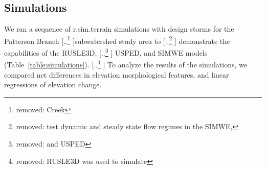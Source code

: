 \documentclass[gmd, manuscript]{copernicus}
\providecommand{\DIFadd}[1]{{\protect\color{blue} \sf #1}} %
\providecommand{\DIFdel}[1]{{\protect\color{red} [..\footnote{removed: #1} ]}} %
\providecommand{\DIFaddbegin}{} %
\providecommand{\DIFaddend}{} %
\providecommand{\DIFdelbegin}{} %
\providecommand{\DIFdelend}{} %
\begin{document}
\subsection{Simulations}
%
We ran a sequence of r.sim.terrain simulations 
\DIFaddbegin \DIFadd{with design storms
}\DIFaddend for the Patterson Branch \DIFdelbegin \DIFdel{Creek }\DIFdelend subwatershed study area
to \DIFdelbegin \DIFdel{test dynamic and steady state flow regimes
in the SIMWE, }\DIFdelend \DIFaddbegin \DIFadd{demonstrate the capabilities 
of the }\DIFaddend RUSLE3D, \DIFdelbegin \DIFdel{and USPED}\DIFdelend \DIFaddbegin \DIFadd{USPED, and SIMWE }\DIFaddend models
(Table~\ref{table:simulations}).
%
\DIFdelbegin \DIFdel{RUSLE3D was used to simulate }\DIFdelend \DIFaddbegin \DIFadd{To analyze the results of the simulations,
we compared 
net differences in elevation
morphological features,
and linear regressions of elevation change.
}
\end{document}
